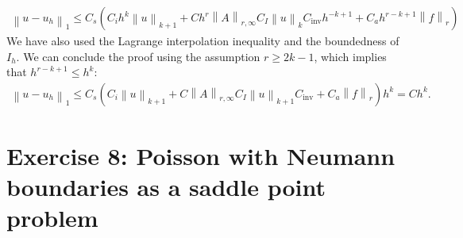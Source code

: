 \documentclass[a4paper]{article}
\newcommand{\norm}[1]{\left\lVert#1\right\rVert}
\begin{document}
\begin{description}
\begin{gather*}
	\norm{u-u_h}_1 \leq C_s \left(
		C_i h^k \norm{u}_{k+1}
		+ C h^r \norm{A}_{r,\infty} C_I \norm{u}_k C_\text{inv} h^{-k+1}
		+ C_a h^{r-k+1} \norm{f}_r
	\right)
	\end{gather*}
	We have also used the Lagrange interpolation inequality and the boundedness of $I_h$.
	We can conclude the proof using the assumption $r \geq 2k-1$, which implies that
	$h^{r-k+1} \leq h^k$:
	\begin{gather*}
	\norm{u-u_h}_1 \leq C_s \left(
		C_i \norm{u}_{k+1}
		+ C \norm{A}_{r,\infty} C_I \norm{u}_{k+1} C_\text{inv}
		+ C_a \norm{f}_r
	\right) h^k = C h^k.
	\end{gather*}
\end{description}

\section*{Exercise 8: Poisson with Neumann boundaries as a saddle point problem}
\end{document}
